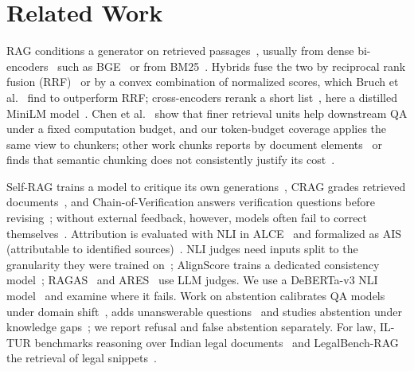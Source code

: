 \section{Related Work}
\label{sec:related}

RAG conditions a generator on retrieved passages~\cite{lewis2020rag}, usually from dense bi-encoders~\cite{karpukhin2020dpr} such as BGE~\cite{xiao2024cpack} or from BM25~\cite{robertson2009bm25}.
Hybrids fuse the two by reciprocal rank fusion (RRF)~\cite{cormack2009rrf} or by a convex combination of normalized scores, which Bruch et al.~\cite{bruch2023fusion} find to outperform RRF; cross-encoders rerank a short list~\cite{nogueira2019bert}, here a distilled MiniLM model~\cite{wang2020minilm}.
Chen et al.~\cite{chen2024densex} show that finer retrieval units help downstream QA under a fixed computation budget, and our token-budget coverage applies the same view to chunkers; other work chunks reports by document elements~\cite{jimeno2024chunking} or finds that semantic chunking does not consistently justify its cost~\cite{qu2024semantic}.

Self-RAG trains a model to critique its own generations~\cite{asai2024selfrag}, CRAG grades retrieved documents~\cite{yan2024crag}, and Chain-of-Verification answers verification questions before revising~\cite{dhuliawala2024cove}; without external feedback, however, models often fail to correct themselves~\cite{huang2024selfcorrect}.
Attribution is evaluated with NLI in ALCE~\cite{gao2023alce} and formalized as AIS (attributable to identified sources)~\cite{rashkin2023ais}. NLI judges need inputs split to the granularity they were trained on~\cite{laban2022summac}; AlignScore trains a dedicated consistency model~\cite{zha2023alignscore}; RAGAS~\cite{es2024ragas} and ARES~\cite{saadfalcon2024ares} use LLM judges. We use a DeBERTa-v3 NLI model~\cite{he2021debertav3} and examine where it fails.
Work on abstention calibrates QA models under domain shift~\cite{kamath2020selective}, adds unanswerable questions~\cite{rajpurkar2018squad2} and studies abstention under knowledge gaps~\cite{feng2024abstain}; we report refusal and false abstention separately.
For law, IL-TUR benchmarks reasoning over Indian legal documents~\cite{joshi2024iltur} and LegalBench-RAG the retrieval of legal snippets~\cite{pipitone2024legalbenchrag}.
